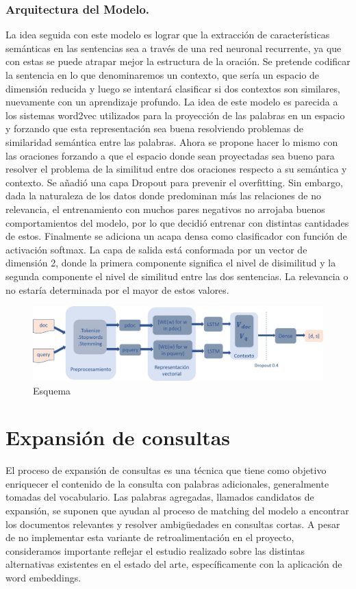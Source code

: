 \documentclass{llncs}
\begin{document}
\subsubsection{Arquitectura del Modelo.}
La idea seguida con este modelo es lograr que la extracción de características semánticas en las sentencias sea a través de una red neuronal recurrente, ya que con estas se puede atrapar mejor la estructura de la oración. Se pretende codificar la sentencia en lo que denominaremos un contexto, que sería un espacio de dimensión reducida y luego se intentará clasificar si dos contextos son similares, nuevamente con un aprendizaje profundo.
La idea de este modelo es parecida a los sistemas word2vec utilizados para la proyección de las palabras en un espacio y forzando que esta representación sea buena resolviendo problemas de similaridad semántica entre las palabras. Ahora se propone hacer lo mismo con las oraciones forzando a que el espacio donde sean proyectadas sea bueno para resolver el problema de la similitud entre dos oraciones respecto a su semántica y contexto. 
Se añadió una capa Dropout para prevenir el overfitting. Sin embargo, dada la naturaleza de los datos donde predominan más las relaciones de no relevancia, el entrenamiento con muchos pares negativos no arrojaba buenos comportamientos del modelo, por lo que decidió entrenar con distintas cantidades de estos. Finalmente se adiciona un acapa densa como clasificador con función de activación softmax. La capa de salida está conformada por un vector de dimensión 2, donde la primera componente significa el nivel de disimilitud y la segunda componente el nivel de similitud entre las dos sentencias. La relevancia o no estaría determinada por el mayor de estos valores.

\begin{figure}
	\begin{center}
		\includegraphics[width=\linewidth]{ ./images/lstm.jpg}
		\caption{Esquema}
		\label{lstm}
	\end{center}
\end{figure}

\section{Expansión de consultas}
El proceso de expansión de consultas es una técnica que tiene como objetivo enriquecer el contenido de la consulta con palabras adicionales, generalmente tomadas del vocabulario. Las palabras agregadas, llamados candidatos de expansión, se suponen que ayudan al proceso de matching del modelo a encontrar los documentos relevantes y resolver ambig\"uedades en consultas cortas. A pesar de no implementar esta variante de retroalimentación en el proyecto, consideramos importante reflejar el estudio realizado sobre las distintas alternativas existentes en el estado del arte, específicamente con la aplicación de word embeddings.  
\end{document}
